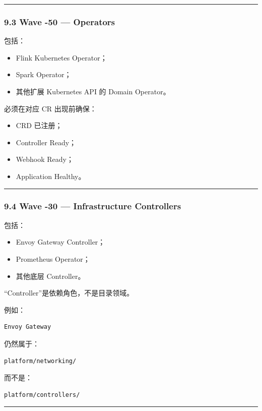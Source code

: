 \documentclass[11pt,a4paper]{article}
\begin{document}
\vspace{0.5em}\hrule\vspace{0.5em}
\subsubsection{9.3 Wave -50 — Operators}
包括：

\begin{itemize}
  \item Flink Kubernetes Operator；
  \item Spark Operator；
  \item 其他扩展 Kubernetes API 的 Domain Operator。
\end{itemize}
必须在对应 CR 出现前确保：

\begin{itemize}
  \item CRD 已注册；
  \item Controller Ready；
  \item Webhook Ready；
  \item Application Healthy。
\end{itemize}
\vspace{0.5em}\hrule\vspace{0.5em}
\subsubsection{9.4 Wave -30 — Infrastructure Controllers}
包括：

\begin{itemize}
  \item Envoy Gateway Controller；
  \item Prometheus Operator；
  \item 其他底层 Controller。
\end{itemize}
“Controller”是依赖角色，不是目录领域。

例如：

\begin{lstlisting}[language=text]
Envoy Gateway
\end{lstlisting}
仍然属于：

\begin{lstlisting}[language=text]
platform/networking/
\end{lstlisting}
而不是：

\begin{lstlisting}[language=text]
platform/controllers/
\end{lstlisting}
\vspace{0.5em}\hrule\vspace{0.5em}
\end{document}
